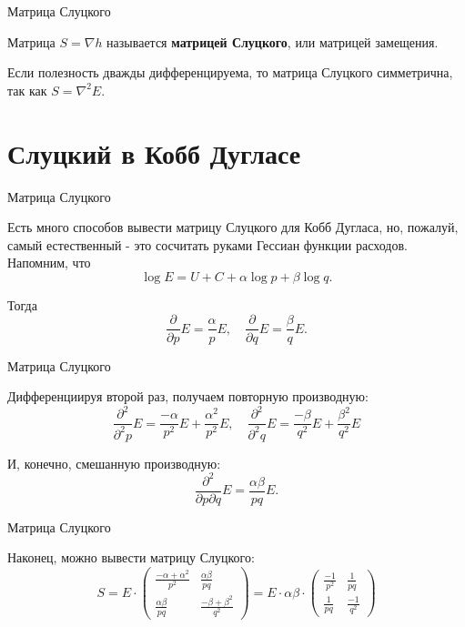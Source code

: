 \documentclass{beamer}
\begin{document}
\begin{frame}{Матрица Слуцкого}

\begin{definition}
Матрица $S = \nabla h$ называется \textbf{матрицей Слуцкого}, или матрицей замещения.
\end{definition}

\begin{lemma}
Если полезность дважды дифференцируема, то матрица Слуцкого симметрична, так как $S = \nabla^2 E$.
\end{lemma}

\end{frame}

\section{Слуцкий в Кобб Дугласе}

\begin{frame}{Матрица Слуцкого}

Есть много способов вывести матрицу Слуцкого для Кобб Дугласа, но, пожалуй, самый естественный - это сосчитать руками Гессиан функции расходов. Напомним, что
$$ \log E = U + C + \alpha \log p + \beta \log q.$$

Тогда 
$$ \frac{\partial}{\partial p} E = \frac{\alpha}{p} E, \quad \frac{\partial}{\partial q} E = \frac{\beta}{q} E.$$

\end{frame}

\begin{frame}{Матрица Слуцкого}

Дифференциируя второй раз, получаем повторную производную:
$$ \frac{\partial^2}{\partial^2 p} E = \frac{-\alpha}{p^2} E + \frac{\alpha^2}{p^2} E, \quad \frac{\partial^2}{\partial^2 q} E = \frac{-\beta}{q^2} E + \frac{\beta^2}{q^2} E$$

И, конечно, смешанную производную:
$$ \frac{\partial^2}{\partial p \partial q} E = \frac{\alpha \beta}{p q} E.$$

\end{frame}

\begin{frame}{Матрица Слуцкого}

Наконец, можно вывести матрицу Слуцкого:
$$ S = 
E \cdot 
\begin{pmatrix} 
\frac{-\alpha + \alpha^2}{p^2} & \frac{\alpha \beta}{p q} \\
\frac{\alpha \beta}{p q} & \frac{-\beta +\beta^2}{q^2}
\end{pmatrix} = 
E \cdot \alpha \beta \cdot
\begin{pmatrix} 
\frac{-1}{p^2} & \frac{1}{p q} \\
\frac{1}{p q} & \frac{-1}{q^2}
\end{pmatrix}
$$
\end{frame}
\end{document}
